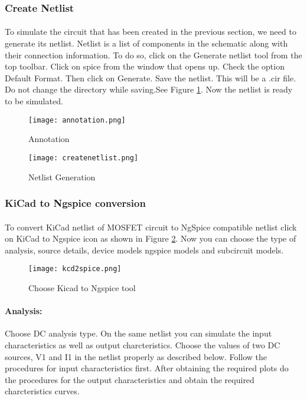\subsubsection{Create Netlist}

\paragraph{}To simulate the circuit that has been created in the previous section, we need to generate
its netlist. Netlist is a list of components in the schematic along with their connection
information. To do so, click on the Generate netlist tool from the top toolbar. Click on
spice from the window that opens up. Check the option Default Format. Then click
on Generate. Save the netlist. This will be a .cir file. Do
not change the directory while saving.See Figure \ref{createnetlist8}.
 Now the netlist is ready to be simulated. 
\begin{figure}
\begin{minipage}{.5\textwidth}
  \centering
  \texttt{[image: annotation.png]}
  \caption{Annotation}
  \label{annotation8}
\end{minipage}%
\begin{minipage}{.5\textwidth}
  \centering
  \texttt{[image: createnetlist.png]}
  \caption{Netlist Generation}
  \label{createnetlist8}
\end{minipage}
\end{figure}

\subsubsection{KiCad to Ngspice conversion}

\paragraph{} To convert KiCad netlist of MOSFET circuit to NgSpice
compatible netlist click on KiCad to Ngspice icon as shown in Figure \ref{kcd2spice9}. Now you can choose the type of analysis, source details, device models ngspice models and subcircuit models.


\begin{figure}[h]
\centering
\texttt{[image: kcd2spice.png]}
\caption{Choose Kicad to Ngspice tool}
\label{kcd2spice9}
\end{figure}


\paragraph{Analysis:}Choose DC analysis type. On the same netlist you can simulate the input characteristics as well as output charcteristics. Choose the values of two DC sources, V1 and I1 in the netlist properly as described below. Follow the procedures for input characteristics first. After obtaining the required plots do the procedures for the output characteristics and obtain the required charcteristics curves.

